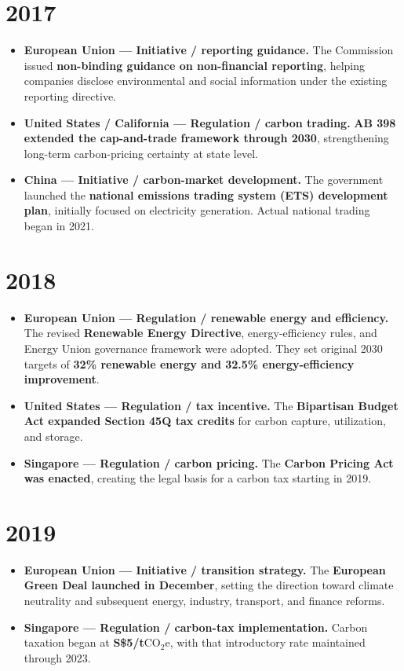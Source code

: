 \documentclass[11pt,a4paper]{article}
\newcommand{\coeq}{\ensuremath{\mathrm{CO}_{2}\mathrm{e}}}
\newcommand{\entry}[3]{\item \textbf{#1 --- #2.} #3}
\begin{document}
\section*{2017}
\begin{itemize}
\entry{European Union}{Initiative / reporting guidance}{The Commission issued \textbf{non-binding guidance on non-financial reporting}, helping companies disclose environmental and social information under the existing reporting directive.\cite{nfrdguidance}}
\entry{United States / California}{Regulation / carbon trading}{\textbf{AB 398 extended the cap-and-trade framework through 2030}, strengthening long-term carbon-pricing certainty at state level.\cite{california}}
\entry{China}{Initiative / carbon-market development}{The government launched the \textbf{national emissions trading system (ETS) development plan}, initially focused on electricity generation. Actual national trading began in 2021.\cite{china2017,china2025}}
\end{itemize}

\section*{2018}
\begin{itemize}
\entry{European Union}{Regulation / renewable energy and efficiency}{The revised \textbf{Renewable Energy Directive}, energy-efficiency rules, and Energy Union governance framework were adopted. They set original 2030 targets of \textbf{32\% renewable energy and 32.5\% energy-efficiency improvement}.\cite{eu2018}}
\entry{United States}{Regulation / tax incentive}{The \textbf{Bipartisan Budget Act expanded Section 45Q tax credits} for carbon capture, utilization, and storage.\cite{us45q}}
\entry{Singapore}{Regulation / carbon pricing}{The \textbf{Carbon Pricing Act was enacted}, creating the legal basis for a carbon tax starting in 2019.\cite{sgact}}
\end{itemize}

\section*{2019}
\begin{itemize}
\entry{European Union}{Initiative / transition strategy}{The \textbf{European Green Deal launched in December}, setting the direction toward climate neutrality and subsequent energy, industry, transport, and finance reforms.\cite{greendeal}}
\entry{Singapore}{Regulation / carbon-tax implementation}{Carbon taxation began at \textbf{S\$5/t\coeq}, with that introductory rate maintained through 2023.\cite{sgtax}}
\end{itemize}
\end{document}
